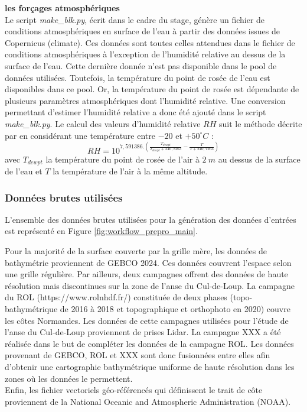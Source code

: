 \documentclass[10pt,a4paper,titlepage]{article}
\begin{document}
    \textbf{les forçages atmosphériques}\\
    \label{par:forcages_atm}
    Le script \textit{make\_blk.py}, écrit dans le cadre du stage, génère un fichier de conditions atmosphériques en surface de l'eau à partir des données issues de Copernicus (climate).
    Ces données sont toutes celles attendues dans le fichier de conditions atmosphériques à l'exception de l'humidité relative au dessus de la surface de l'eau. Cette dernière donnée n'est pas disponible dans le pool de données utilisées.
    Toutefois, la température du point de rosée de l'eau est disponibles dans ce pool.
    Or, la température du point de rosée est dépendante de plusieurs paramètres atmosphériques dont l'humidité relative.
    Une conversion permettant d'estimer l'humidité relative a donc été ajouté dans le script \textit{make\_blk.py}.
    Le calcul des valeurs d'humidité relative $RH$ suit le méthode décrite par \cite{humidity_formulation} en considérant une température entre $-20$ et $+50 ^\circ C$ :
    $$RH = 10^{7,591386.(\frac{T_{dewpt}}{T_{dewpt}+240,7263}-\frac{T}{T+240,7263})}$$
    avec $T_{dewpt}$ la température du point de rosée de l'air à $2~m$ au dessus de la surface de l'eau et $T$ la température de l'air à la même altitude.
    
    \subsubsection{Données brutes utilisées}
    
    L'ensemble des données brutes utilisées pour la génération des données d'entrées est représenté en Figure \ref{fig:workflow_prepro_main}.
    
    Pour la majorité de la surface couverte par la grille mère, les données de bathymétrie proviennent de GEBCO 2024.
    Ces données couvrent l'espace selon une grille régulière.
    Par ailleurs, deux campagnes offrent des données de haute résolution mais discontinues sur la zone de l'anse du Cul-de-Loup.
    La campagne du ROL (https://www.rolnhdf.fr/) constituée de deux phases (topo-bathymétrique de 2016 à 2018 et topographique et orthophoto en 2020) couvre les côtes Normandes.
    Les données de cette campagnes utilisées pour l'étude de l'anse du Cul-de-Loup proviennent de prises Lidar.
    La campagne XXX a été réalisée dans le but de compléter les données de la campagne ROL.
    Les données provenant de GEBCO, ROL et XXX sont donc fusionnées entre elles afin d'obtenir une cartographie bathymétrique uniforme de haute résolution dans les zones où les données le permettent.
    \\
    Enfin, les fichier vectoriels géo-référencés qui définissent le trait de côte proviennent de la National Oceanic and Atmospheric Administration (NOAA).
    
\end{document}
